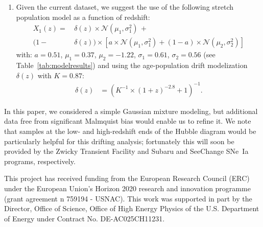 \documentclass[]{aa} %
\newcommand{\nn}[1]{{\textcolor[rgb]{0.25, 0.50, 0}{#1}}}
\begin{document}
\begin{enumerate}
    \item Given the current dataset, we suggest the use of the following stretch
        population model as a function of redshift:
        \begin{align}\label{eqconclusion:stretchz}
            X_1\left(z \right) =
             &\,\delta(z)\times\mathcal{N}(\mu_1,\sigma_1^2)\,+\nonumber\\
            (1-&\,\delta(z)) \times  \left[a\times\mathcal{N}(\mu_1,\sigma_1^2) +
            (1-a)\times\mathcal{N}(\mu_2,\sigma_2^2)\right]
        \end{align}
        with: $a=0.51$, $\mu_1=0.37$, $\mu_2=-1.22$, $\sigma_1=0.61$,
        $\sigma_2=0.56$ (see Table~\ref{tab:modelresults}) and using the
        age-population drift modelization $\delta(z)$ with $K=0.87$:
        \begin{align}
            \delta(z) & = \left( K^{-1} \times (1+z)^{-2.8} +1 \right)^{-1}.
        \end{align}
\end{enumerate}

\nn{In this paper, we considered} a simple Gaussian mixture modeling, but
additional data free from significant Malmquist bias would enable us to refine
it. We note that samples at the low- and high-redshift
ends of the Hubble diagram would be particularly helpful for this drifting
analysis; fortunately this will soon be provided by the Zwicky Transient Facility \citep{bellm2019, graham2019} and Subaru and SeeChange SNe~Ia programs, respectively.

\begin{acknowledgements}
    This project has received funding from the European Research Council (ERC)
    under the European Union's Horizon 2020 research and innovation programme
    (grant agreement n 759194 - USNAC).
    This work was supported in part by the Director, Office of Science, Office of High Energy Physics of the U.S. Department of Energy under Contract No. DE-AC025CH11231.
\end{acknowledgements}
\end{document}
